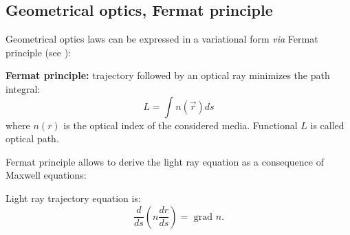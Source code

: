 \documentclass[12pt]{book}
\begin{document}
\subsection{Geometrical optics, Fermat principle}\label{secFermat}
Geometrical optics laws can be expressed in a variational form
 {\it via} Fermat principle (see \cite{ph:optic:Born65}):
\begin{prin}
{\bf Fermat principle:} trajectory followed by an optical ray minimizes the
path integral:
\begin{equation}
L=\int n(\vec r) ds
\end{equation}
where $n(r)$ is the optical index of the considered
media. Functional $L$ is called optical path.
\end{prin}
Fermat principle allows to derive the light ray equation
 as a consequence of Maxwell equations: 
\begin{thm}
Light ray trajectory equation is:
\begin{equation}
\frac{d}{ds}(n\frac{dr}{ds})=\mbox{ grad } n.
\end{equation}
\end{thm}
\end{document}
